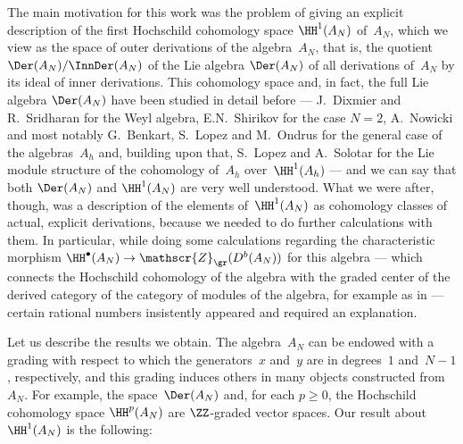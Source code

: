 The main motivation for this work was the problem of giving an explicit
description of the first Hochschild cohomology space $\HH^1(A_N)$ of~$A_N$,
which we view as the space of outer derivations of the algebra~$A_N$, that
is, the quotient $\Der(A_N)/\InnDer(A_N)$ of the Lie algebra $\Der(A_N)$ of
all derivations of~$A_N$ by its ideal of inner derivations. This cohomology
space and, in fact, the full Lie algebra $\Der(A_N)$ have been studied in
detail before --- J.~Dixmier 
and R.~Sridharan \cite{Sridharan} for the Weyl algebra, E.N.~Shirikov
 for the
case $N=2$, A.~Nowicki \cite{Nowicki} and most notably G.~Benkart, S.~Lopez
and M.~Ondrus \cite{BLO:3} for the general case of the algebras~$A_h$ and,
building upon that, S.~Lopez and A.~Solotar \cite{LSo} for the Lie module
structure of the cohomology of~$A_h$ over~$\HH^1(A_h)$ --- and we can say
that both $\Der(A_N)$ and $\HH^1(A_N)$ are very well understood. What we
were after, though, was a description of the elements of~$\HH^1(A_N)$ as
cohomology classes of actual, explicit derivations, because we needed to do
further calculations with them. In particular, while doing some
calculations regarding the characteristic morphism
$\HH^\bullet(A_N)\to\mathscr{Z}_{\gr}(D^b(A_N))$ for this algebra --- which
connects the Hochschild cohomology of the algebra with the graded center of
the derived category of the category of modules of the algebra, for example
as in \cite{Lowen} --- certain rational numbers insistently appeared and
required an explanation.

\bigskip

Let us describe the results we obtain. The algebra~$A_N$ can be endowed
with a grading with respect to which the generators~$x$ and~$y$
are in degrees~$1$ and~$N-1$, respectively, and this grading induces others
in many objects constructed from~$A_N$. For example, the space~$\Der(A_N)$
and, for each $p\geq0$, the Hochschild cohomology space $\HH^p(A_N)$ are
$\ZZ$-graded vector spaces. Our result about~$\HH^1(A_N)$ is the following:

